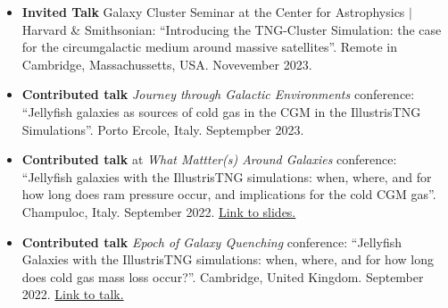 \documentclass[a4paper,10pt,oneside]{article}
\begin{document}
\begin{itemize}[wide, labelwidth=!, labelindent=-11pt, parsep=0pt]
    \item {\bf Invited Talk} Galaxy Cluster Seminar at the Center for Astrophysics $\vert$ Harvard \& Smithsonian: ``Introducing the TNG-Cluster Simulation: the case for the circumgalactic medium around massive satellites''. Remote in Cambridge, Massachussetts, USA. Novevember 2023. 
    \item {\bf Contributed talk} {\it Journey through Galactic Environments} conference: ``Jellyfish galaxies as sources of cold gas in the CGM in the IllustrisTNG Simulations''. Porto Ercole, Italy. Septempber 2023.
    \item {\bf Contributed talk} at {\it What Mattter(s) Around Galaxies} conference: ``Jellyfish galaxies with the IllustrisTNG simulations: when, where, and for how long does ram pressure occur, and implications for the cold CGM gas''. Champuloc, Italy. September 2022. \href{https://drive.google.com/file/u/0/d/1x4FNVCmUWTFwznOAs9RYhLwkKl-kmhZT/view?usp=drive_web}{Link to slides.}
    \item {\bf Contributed talk} {\it Epoch of Galaxy Quenching} conference: ``Jellyfish Galaxies with the IllustrisTNG simulations: when, where, and for how long does cold gas mass loss occur?''. Cambridge, United Kingdom. September 2022. \href{https://sites.google.com/cam.ac.uk/quenching/programme#h.ohkoyw4ilbje}{Link to talk.}

\end{itemize}
\end{document}
